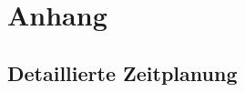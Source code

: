 \documentclass[11pt,toc=sectionentrywithoutdots, 
headheight=44pt, headings=optiontoheadandtoc, hyperfootnotes=false]{scrartcl}
\begin{document}
\printbibliography



\label{myLastPage}

\newpage


\setcounter{page}{1}
\setcounter{secnumdepth}{2}
\setcounter{section}{1}
\renewcommand{\thesection}{A}


\ofoot{\thepage}




\section{Anhang}
\subsection{Detaillierte Zeitplanung}
\end{document}
